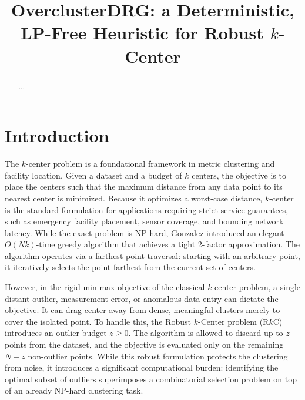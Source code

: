 \documentclass[twoside,leqno,twocolumn]{article}
\newcommand{\rkc}{R$k$C}
\begin{document}
\newcommand\relatedversion{}

\title{\Large OverclusterDRG: a Deterministic, LP-Free Heuristic for Robust $k$-Center\relatedversion}

\date{}

\maketitle


\begin{abstract}
...
\end{abstract}


\section{Introduction}

The $k$-center problem is a foundational framework in metric clustering and facility location. Given a dataset and a budget of $k$ centers, the objective is to place the centers such that the maximum distance from any data point to its nearest center is minimized. Because it optimizes a worst-case distance, $k$-center is the standard formulation for applications requiring strict service guarantees, such as emergency facility placement, sensor coverage, and bounding network latency. While the exact problem is NP-hard, Gonzalez \cite{gonzalez1985} introduced an elegant $O(Nk)$-time greedy algorithm that achieves a tight 2-factor approximation. The algorithm operates via a farthest-point traversal: starting with an arbitrary point, it iteratively selects the point farthest from the current set of centers.

However, in the rigid min-max objective of the classical $k$-center problem, a single distant outlier, measurement error, or anomalous data entry can dictate the objective. It can drag center away from dense, meaningful clusters merely to cover the isolated point. To handle this, the Robust $k$-Center problem (\rkc) introduces an outlier budget $z \ge 0$. The algorithm is allowed to discard up to $z$ points from the dataset, and the objective is evaluated only on the remaining $N - z$ non-outlier points. While this robust formulation protects the clustering from noise, it introduces a significant computational burden: identifying the optimal subset of outliers superimposes a combinatorial selection problem on top of an already NP-hard clustering task.
\end{document}
